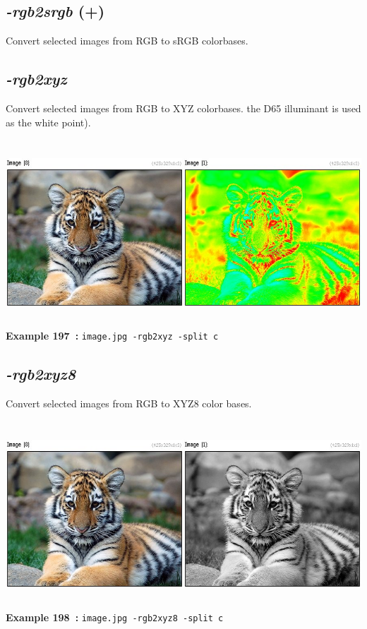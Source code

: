 \documentclass[a4paper,11pt,twoside]{book}
\begin{document}
\subsection{\emph{-rgb2srgb} (+)}\vspace*{-0.5em}
Convert selected images from RGB to sRGB colorbases.


\subsection{\emph{-rgb2xyz} }\vspace*{-0.5em}
Convert selected images from RGB to XYZ colorbases.
the D65 illuminant is used as the white point).
\begin{center}\includegraphics[keepaspectratio=true,height=7cm,width=\textwidth]{img/gmic_def197.jpg}\\
{\footnotesize \textbf{Example 197~:} \texttt{image.jpg -rgb2xyz -split c}}
\end{center}

\subsection{\emph{-rgb2xyz8} }\vspace*{-0.5em}
Convert selected images from RGB to XYZ8 color bases.
\begin{center}\includegraphics[keepaspectratio=true,height=7cm,width=\textwidth]{img/gmic_def198.jpg}\\
{\footnotesize \textbf{Example 198~:} \texttt{image.jpg -rgb2xyz8 -split c}}
\end{center}
\end{document}
